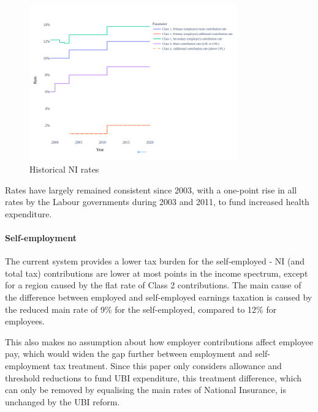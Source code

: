 \documentclass{article}
\begin{document}
    \begin{figure}
        \centering
        \includegraphics[width=0.8\textwidth]{images/fig_7.png}
        \caption{Historical NI rates}
        \label{fig:NI_rates}
    \end{figure}

    Rates have largely remained consistent since 2003, with a one-point rise in all rates by the Labour governments during 2003 and 2011, to fund increased health expenditure.

    \paragraph{Self-employment} The current system provides a lower tax burden for the self-employed - NI (and total tax) contributions are lower at most points in the income spectrum, except for a region caused by the flat rate of Class 2 contributions. The main cause of the difference between employed and self-employed earnings taxation is caused by the reduced main rate of 9\% for the self-employed, compared to 12\% for employees. 
    
    This also makes no assumption about how employer contributions affect employee pay, which would widen the gap further between employment and self-employment tax treatment. Since this paper only considers allowance and threshold reductions to fund UBI expenditure, this treatment difference, which can only be removed by equalising the main rates of National Insurance, is unchanged by the UBI reform.
\end{document}
